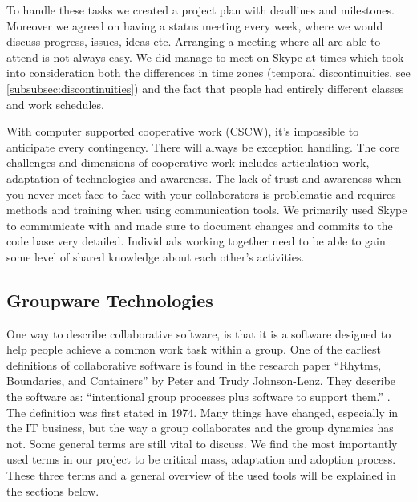 To handle these tasks we created a project plan with deadlines and milestones. 
Moreover we agreed on having a status meeting every week, where we would discuss progress, issues, ideas etc. Arranging a meeting where all are able to attend is not always easy. We did manage to meet on Skype at times which took into consideration both the differences in time zones (temporal discontinuities, see \ref{subsubsec:discontinuities}) and the fact that people had entirely different classes and work schedules.

With computer supported cooperative work (CSCW), it's impossible to anticipate every contingency. There will always be exception handling. The core challenges and dimensions of cooperative work includes articulation work, adaptation of technologies and awareness. The lack of trust and awareness when you never meet face to face with your collaborators is problematic and requires methods and training when using communication tools. We primarily used Skype to communicate with and made sure to document changes and commits to the code base very detailed. Individuals working together need to be able to gain some level of shared knowledge about each other's activities.


\subsection{Groupware Technologies} \label{subsec:groupwaretechnologies}
One way to describe collaborative software, is that it is a software designed to help people achieve a common work task within a group. One of the earliest definitions of collaborative software is found in the research paper ``Rhytms, Boundaries, and Containers'' by Peter and Trudy Johnson-Lenz. They describe the software as: ``intentional group processes plus software to support them.'' \cite{johnson1991post}. The definition was first stated in 1974. Many things have changed, especially in the IT business, but the way a group collaborates and the group dynamics has not. Some general terms are still vital to discuss. We find the most importantly used terms in our project to be critical mass, adaptation and adoption process. These three terms and a general overview of the used tools will be explained in the sections below.

